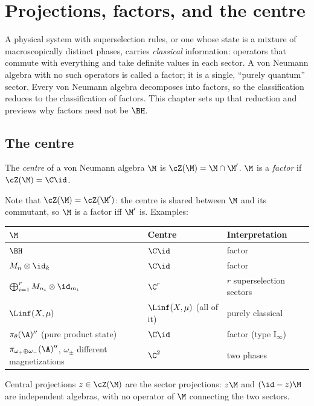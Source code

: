 \chapter{Projections, factors, and the centre}\label{ch:factors}

\begin{physmotiv}
A physical system with superselection rules, or one whose state is a mixture of macroscopically distinct phases, carries \emph{classical} information: operators that commute with everything and take definite values in each sector. A von Neumann algebra with no such operators is called a factor; it is a single, ``purely quantum'' sector. Every von Neumann algebra decomposes into factors, so the classification reduces to the classification of factors. This chapter sets up that reduction and previews why factors need not be $\BH$.
\end{physmotiv}

\section{The centre}

\begin{definition}
The \emph{centre} of a von Neumann algebra $\M$ is $\cZ(\M)=\M\cap\M'$. $\M$ is a \emph{factor} if $\cZ(\M)=\C\id$.
\end{definition}

Note that $\cZ(\M)=\cZ(\M')$: the centre is shared between $\M$ and its commutant, so $\M$ is a factor iff $\M'$ is. Examples:
\begin{center}
\renewcommand{\arraystretch}{1.3}
\begin{tabular}{@{}lll@{}}
\toprule
$\M$ & Centre & Interpretation\\
\midrule
$\BH$ & $\C\id$ & factor\\
$M_n\otimes\id_k$ & $\C\id$ & factor\\
$\bigoplus_{i=1}^rM_{n_i}\otimes\id_{m_i}$ & $\C^r$ & $r$ superselection sectors\\
$\Linf(X,\mu)$ & $\Linf(X,\mu)$ (all of it) & purely classical\\
$\pi_\theta(\A)''$ (pure product state) & $\C\id$ & factor (type I$_\infty$)\\
$\pi_{\omega_+\oplus\omega_-}(\A)''$, $\omega_\pm$ different magnetizations & $\C^2$ & two phases\\
\bottomrule
\end{tabular}
\end{center}
Central projections $z\in\cZ(\M)$ are the sector projections: $z\M$ and $(\id-z)\M$ are independent algebras, with no operator of $\M$ connecting the two sectors.

